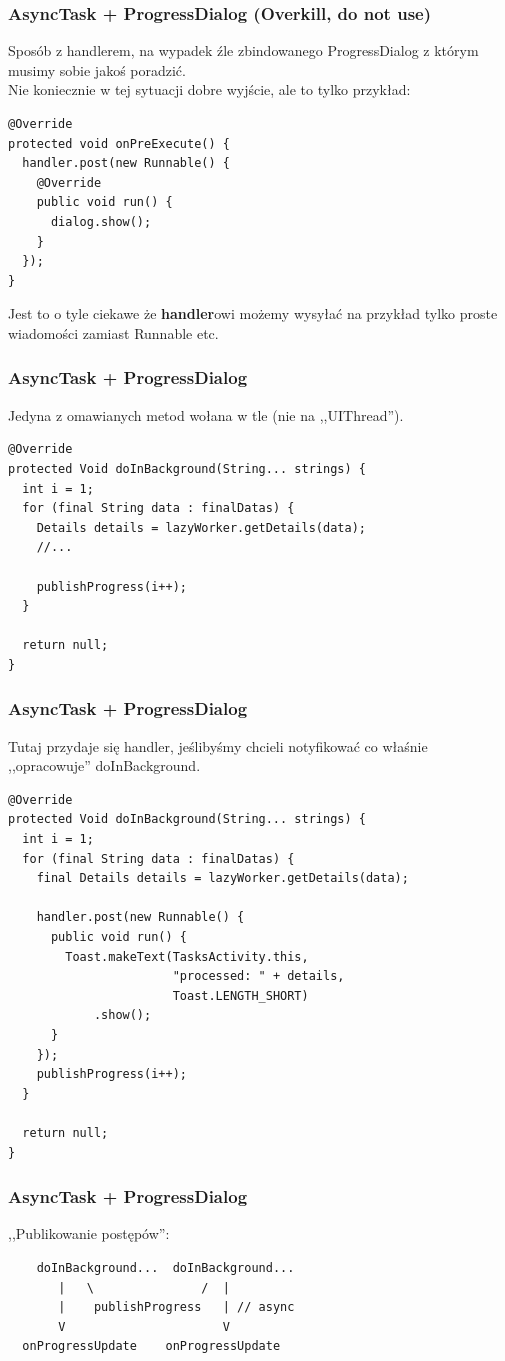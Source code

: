 \begin{frame}[fragile]\frametitle{AsyncTask + ProgressDialog (\textbf{Overkill}, do not use)}
Sposób z handlerem, na wypadek źle zbindowanego ProgressDialog z którym musimy sobie jakoś poradzić. \\
Nie koniecznie w tej sytuacji dobre wyjście, ale to tylko przykład:
\begin{lstlisting}
@Override
protected void onPreExecute() {
  handler.post(new Runnable() {
    @Override
    public void run() {
      dialog.show();
    }
  });
}
\end{lstlisting}
Jest to o tyle ciekawe że \textbf{handler}owi możemy wysyłać na przykład tylko proste wiadomości zamiast Runnable etc.
\end{frame}


\begin{frame}[fragile]\frametitle{AsyncTask + ProgressDialog}
Jedyna z omawianych metod wołana w tle (nie na ,,UIThread'').
\begin{lstlisting}
@Override
protected Void doInBackground(String... strings) {
  int i = 1;
  for (final String data : finalDatas) {
    Details details = lazyWorker.getDetails(data);
    //...

    publishProgress(i++);
  }

  return null;
}
\end{lstlisting}
\end{frame}

\begin{frame}[fragile]\frametitle{AsyncTask + ProgressDialog}
Tutaj przydaje się handler, jeślibyśmy chcieli notyfikować co właśnie ,,opracowuje'' doInBackground.
\begin{lstlisting}
@Override
protected Void doInBackground(String... strings) {
  int i = 1;
  for (final String data : finalDatas) {
    final Details details = lazyWorker.getDetails(data);

    handler.post(new Runnable() {
      public void run() {
        Toast.makeText(TasksActivity.this, 
                       "processed: " + details, 
                       Toast.LENGTH_SHORT)
            .show();
      }
    });
    publishProgress(i++);
  }

  return null;
}
\end{lstlisting}
\end{frame}

\begin{frame}[fragile]\frametitle{AsyncTask + ProgressDialog}
,,Publikowanie postępów'':
\begin{lstlisting}
    doInBackground...  doInBackground...
       |   \               /  |
       |    publishProgress   | // async
       V                      V
  onProgressUpdate    onProgressUpdate
\end{lstlisting}
\end{frame}


